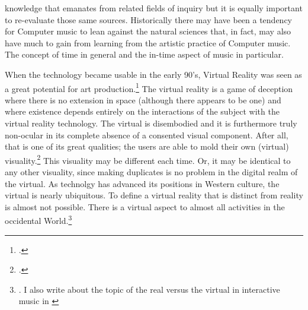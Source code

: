 knowledge that emanates from related fields of inquiry but it is equally important to re-evaluate those same sources. Historically there may have been a tendency for Computer music to lean against the natural sciences that, in fact, may also have much to gain from learning from the artistic practice of Computer music. The concept of time in general and the in-time aspect of music in particular.

When the technology became usable in the early 90's, Virtual Reality was seen as a great potential for art production.\footcite[See for example]{moser96,wood98,dixon07} The virtual reality is a game of deception where there is no extension in space (although there appears to be one) and where existence depends entirely on the interactions of the subject with the virtual reality technology. The virtual is disembodied and it is furthermore truly non-ocular in its complete absence of a consented visual component. After all, that is one of its great qualities; the users are able to mold their own (virtual) visuality.\footcite[Compare to William Gibson's definition of Cyberspace as a ``consensual hallucination''][51]{gibson84} This visuality may be different each time. Or, it may be identical to any other visuality, since making duplicates is no problem in the digital realm of the virtual. As technolgy has advanced its positions in Western culture, the virtual is nearly ubiquitous. To define a virtual reality that is distinct from reality is almost not possible. There is a virtual aspect to almost all activities in the occidental World.\footnote{\cite[See][]{baudrillard02:screened}. I also write about the topic of the real versus the virtual in interactive music in \cite[ch. 4]{frisk08}}

